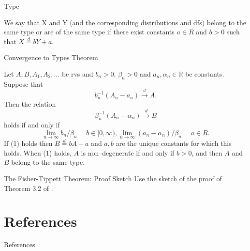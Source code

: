 \documentclass{beamer}
\begin{document}
\begin{frame}{Type}
    \begin{definition}
        We say that X and Y (and the corresponding distributions and dfs) belong to the same type or are of the same type if there exist constants $a \in R$ and $b > 0$ such that $X \overset{d}{=} b Y + a$.
    \end{definition}
\end{frame}

\begin{frame}{Convergence to Types Theorem}
    \begin{theorem}
        Let $A, B, A_1, A_2, \ldots$ be rvs and $b_n > 0$, $\beta_n > 0$ and $a_n, \alpha_n \in \mathbb{R}$ be constants. Suppose that
        \[
        b_n^{-1}(A_n - a_n) \xrightarrow{d} A.
        \]
        Then the relation
        \[
        \beta_n^{-1}(A_n - \alpha_n) \xrightarrow{d} B \tag{1}
        \]
        holds if and only if
        \[
        \lim_{n \to \infty} b_n / \beta_n = b \in [0, \infty), \lim_{n \to \infty} (a_n - \alpha_n) / \beta_n = a \in R. \tag{2}
        \]
        If (1) holds then $B \overset{d}{=} b A + a$ and $a, b$ are the unique constants for which this holds. When (1) holds, $A$ is non–degenerate if and only if $b > 0$, and then $A$ and $B$ belong to the same type.
    \end{theorem}
\end{frame}

\begin{frame}{The Fisher-Tippett Theorem: Proof Sketch}
    Use the sketch of the proof of Theorem 3.2 of \cite{coles_2001}.
\end{frame}

\section{References}

\begin{frame}[allowframebreaks]{References}
    \nocite{*}
    \printbibliography
\end{frame}
\end{document}
